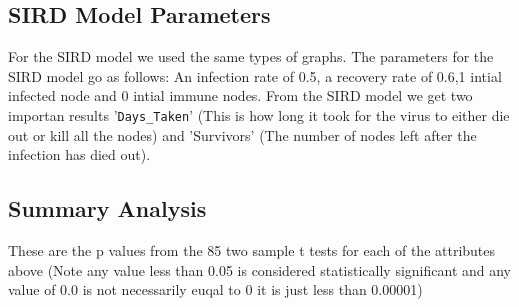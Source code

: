 \documentclass{article}
\begin{document}
            \subsection{SIRD Model Parameters}
                For the SIRD model we used the same types of graphs. The parameters for the SIRD model go as follows: An infection rate of 0.5, a recovery rate of 0.6,1 intial infected node and 0 intial immune nodes. From the SIRD model we get two importan results '\verb|Days_Taken|' (This is how long it took for the virus to either die out or kill all the nodes) and 'Survivors' (The number of nodes left after the infection has died out). 
            \subsection{Summary Analysis}
            These are the p values from the 85 two sample t tests for each of the attributes above (Note any value less than 0.05 is considered statistically significant and any value of 0.0 is not necessarily euqal to 0 it is just less than 0.00001)
\end{document}
